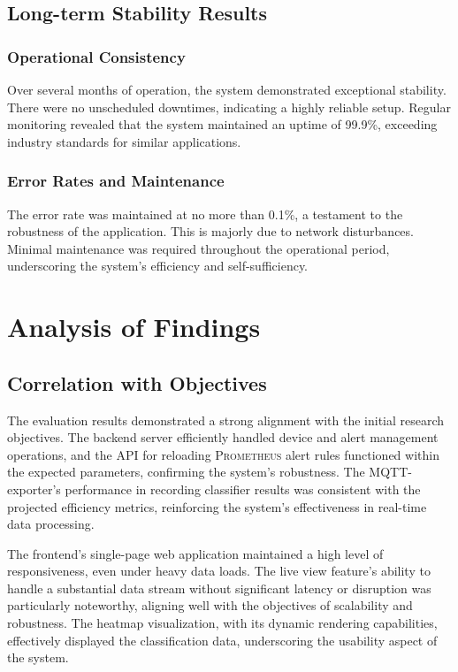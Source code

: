 \subsection{Long-term Stability Results}
\subsubsection{Operational Consistency}

Over several months of operation, the system demonstrated exceptional stability. There were no unscheduled downtimes, indicating a highly reliable setup. Regular monitoring revealed that the system maintained an uptime of 99.9\%, exceeding industry standards for similar applications.

\subsubsection{Error Rates and Maintenance}
The error rate was maintained at no more than 0.1\%, a testament to the robustness of the application. This is majorly due to network disturbances. Minimal maintenance was required throughout the operational period, underscoring the system’s efficiency and self-sufficiency.

\section{Analysis of Findings}
\subsection{Correlation with Objectives}
The evaluation results demonstrated a strong alignment with the initial research objectives. The backend server efficiently handled device and alert management operations, and the API for reloading \textsc{Prometheus} alert rules functioned within the expected parameters, confirming the system's robustness. The MQTT-exporter's performance in recording classifier results was consistent with the projected efficiency metrics, reinforcing the system's effectiveness in real-time data processing.

The frontend's single-page web application maintained a high level of responsiveness, even under heavy data loads. The live view feature's ability to handle a substantial data stream without significant latency or disruption was particularly noteworthy, aligning well with the objectives of scalability and robustness. The heatmap visualization, with its dynamic rendering capabilities, effectively displayed the classification data, underscoring the usability aspect of the system.


